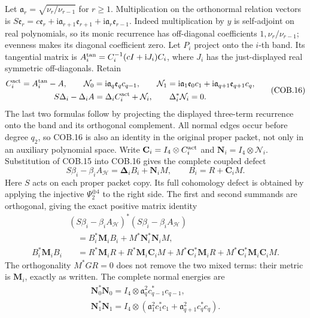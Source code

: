 Let $\mathfrak a_r=\sqrt{\nu_r/\nu_{r-1}}$ for $r\ge1$.
Multiplication on the orthonormal relation vectors is
$S\mathfrak e_r=c\mathfrak e_r+\mathrm i\mathfrak a_{r+1}\mathfrak e_{r+1}
+\mathrm i\mathfrak a_r\mathfrak e_{r-1}$.
Indeed multiplication by $y$ is self-adjoint on real polynomials,
so its monic recurrence has off-diagonal coefficients
$1,\nu_r/\nu_{r-1}$; evenness makes its diagonal coefficient zero.
Let $P_i$ project onto the $i$-th band.  Its tangential matrix is
$A_i^{\rm tan}=C_i^{-1}(cI+\mathrm iJ_i)C_i$, where $J_i$ has the
just-displayed real symmetric off-diagonals.  Retain
\[
 \begin{gathered}
 C_i^{\rm act}=A_i^{\rm tan}-A,\qquad
 \mathcal N_0=\mathrm i\mathfrak a_q\mathfrak e_qc_{q-1},\qquad
 \mathcal N_1=\mathrm i\mathfrak a_1\mathfrak e_0c_1
              +\mathrm i\mathfrak a_{q+1}\mathfrak e_{q+1}c_q,\\
 S\Delta_i-\Delta_iA=\Delta_iC_i^{\rm act}+\mathcal N_i,
 \qquad\Delta_i^*\mathcal N_i=0.
 \end{gathered}\tag{COB.16}
\]
The last two formulas follow by projecting the displayed three-term
recurrence onto the band and its orthogonal complement.  All normal
edges occur before degree $q_2$, so COB.16 is also an identity in
the original proper packet, not only in an auxiliary polynomial space.
Write $\mathbf C_i=I_4\otimes C_i^{\rm act}$ and
$\mathbf N_i=I_4\otimes\mathcal N_i$.  Substitution of COB.15 into
COB.16 gives the complete coupled defect
\[
 \boxed{S\beta_i-\beta_iA_{\mathcal H}
       =\boldsymbol\Delta_i B_i+\mathbf N_iM,
       \qquad B_i=R+\mathbf C_iM.}
 \tag{COB.17}
\]
Here $S$ acts on each proper packet copy.  Its full cohomology defect
is obtained by applying the injective $\Psi_2^{\oplus4}$ to the right
side.  The first and second summands are orthogonal, giving the exact
positive matrix identity
\[
 \begin{split}
 &(S\beta_i-\beta_iA_{\mathcal H})^*
                      (S\beta_i-\beta_iA_{\mathcal H})\\
 &\quad=B_i^*\mathbf M_iB_i+M^*\mathbf N_i^*\mathbf N_iM,\\
 B_i^*\mathbf M_iB_i
 &\quad=R^*\mathbf M_iR+R^*\mathbf M_i\mathbf C_iM
       +M^*\mathbf C_i^*\mathbf M_iR
       +M^*\mathbf C_i^*\mathbf M_i\mathbf C_iM.
 \end{split}\tag{COB.18}
\]
The orthogonality $M^*GR=0$ does not remove the two mixed terms:
their metric is $\mathbf M_i$, exactly as written.  The complete
normal energies are
\[
 \begin{gathered}
 \mathbf N_0^*\mathbf N_0=I_4\otimes
                      \mathfrak a_q^2c_{q-1}^*c_{q-1},\\
 \mathbf N_1^*\mathbf N_1=I_4\otimes
       (\mathfrak a_1^2c_1^*c_1+\mathfrak a_{q+1}^2c_q^*c_q).
 \end{gathered}\tag{COB.19}
\]
